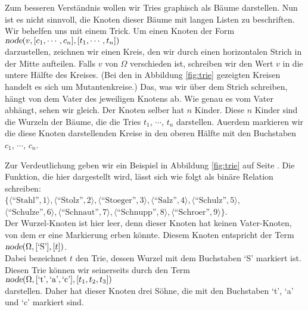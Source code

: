 Zum besseren Verst\"andnis wollen wir Tries graphisch als B\"aume darstellen.
Nun ist es nicht sinnvoll, die Knoten dieser B\"aume mit langen Listen zu beschriften.
Wir behelfen uns mit einem Trick.  Um einen Knoten der Form \\[0.2cm]
\hspace*{1.3cm} 
$\textsl{node}(v, [c_1, \cdots, c_n], [t_1, \cdots, t_n])$ \\[0.2cm]
darzustellen, zeichnen wir einen Kreis,
den wir durch einen horizontalen Strich in der Mitte aufteilen.
Falls $v$ von $\Omega$ verschieden ist, schreiben wir den Wert $v$ in die untere H\"alfte
des Kreises.
(Bei den in Abbildung \ref{fig:trie} gezeigten Kreisen handelt es sich um
Mutantenkreise.)
Das, was wir \"uber dem Strich schreiben,
h\"angt von dem Vater des jeweiligen Knotens ab.  Wie genau es vom Vater abh\"angt, sehen wir gleich.
Der Knoten selber hat $n$ Kinder. Diese $n$ Kinder sind die 
Wurzeln der B\"aume, die die Tries $t_1$, $\cdots$, $t_n$ darstellen.
Au\3erdem markieren wir die diese Knoten darstellenden Kreise in den oberen H\"alfte 
mit den Buchstaben $c_1$, $\cdots$, $c_n$.  


Zur Verdeutlichung geben wir ein Beispiel in 
Abbildung \ref{fig:trie} auf Seite \pageref{fig:trie}.
Die Funktion, die hier dargestellt wird, l\"asst sich wie folgt als bin\"are Relation
schreiben: \\[0.2cm]
\hspace*{1.3cm} $ \bigl\{ \langle \textrm{``Stahl''},   1  \rangle, \langle \textrm{``Stolz''},     2  \rangle, \langle \textrm{``Stoeger''},   3  \rangle, 
             \langle \textrm{``Salz''},      4  \rangle, \langle \textrm{``Schulz''},    5  \rangle$, \\[0.2cm]
\hspace*{1.5cm} $\langle \textrm{``Schulze''},   6  \rangle, \langle \textrm{``Schnaut''},   7  \rangle, 
  \langle \textrm{``Schnupp''},   8  \rangle, 
  \langle \textrm{``Schroer''},   9  \rangle\}$. \\[0.2cm]
Der Wurzel-Knoten ist hier leer, denn dieser Knoten hat keinen Vater-Knoten, von dem er
eine Markierung erben k\"onnte.  Diesem Knoten entspricht der Term \\[0.2cm]
\hspace*{1.3cm} $\textsl{node}(\Omega,[\textrm{`S'}], [t])$. \\[0.2cm]
Dabei bezeichnet $t$ den Trie, dessen Wurzel mit dem Buchstaben `S' markiert ist.
Diesen Trie k\"onnen wir seinerseits durch den Term \\[0.2cm]
\hspace*{1.3cm} 
$\textsl{node}(\Omega,[\textrm{`t'},\textrm{`a'},\textrm{`c'}], [t_1, t_2, t_3])$ \\[0.2cm]
darstellen.  Daher hat dieser Knoten drei S\"ohne, die mit den Buchstaben `t', `a' und `c'
markiert sind.

